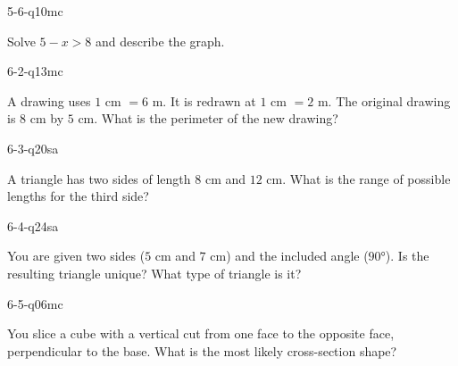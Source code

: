\begin{practiceQuestion}{5-6-q10}{mc}
\begin{questionText}
Solve $5 - x > 8$ and describe the graph.
\end{questionText}
\end{practiceQuestion}

\begin{practiceQuestion}{6-2-q13}{mc}
\begin{questionText}
A drawing uses $1$ cm $= 6$ m. It is redrawn at $1$ cm $= 2$ m. The original drawing is $8$ cm by $5$ cm. What is the perimeter of the new drawing?
\end{questionText}
\end{practiceQuestion}

\begin{practiceQuestion}{6-3-q20}{sa}
\begin{questionText}
A triangle has two sides of length $8$ cm and $12$ cm. What is the range of possible lengths for the third side?
\end{questionText}
\end{practiceQuestion}

\begin{practiceQuestion}{6-4-q24}{sa}
\begin{questionText}
You are given two sides ($5$ cm and $7$ cm) and the included angle ($90°$). Is the resulting triangle unique? What type of triangle is it?
\end{questionText}
\end{practiceQuestion}

\begin{practiceQuestion}{6-5-q06}{mc}
\begin{questionText}
You slice a cube with a vertical cut from one face to the opposite face, perpendicular to the base. What is the most likely cross-section shape?
\end{questionText}
\end{practiceQuestion}

